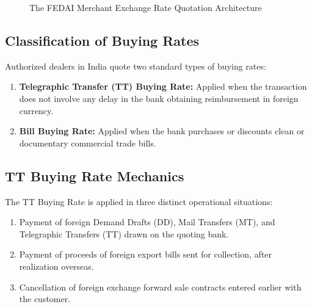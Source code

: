 \begin{figure}[htbp]
{%
    }
    \caption{The FEDAI Merchant Exchange Rate Quotation Architecture}
    \label{fig:fedai_merchant_rates}
\end{figure}

\subsection{Classification of Buying Rates}
Authorized dealers in India quote two standard types of buying rates:
\begin{enumerate}[leftmargin=*]
    \item \textbf{Telegraphic Transfer (TT) Buying Rate:} Applied when the transaction does not involve any delay in the bank obtaining reimbursement in foreign currency.
    \item \textbf{Bill Buying Rate:} Applied when the bank purchases or discounts clean or documentary commercial trade bills.
\end{enumerate}

\subsection{TT Buying Rate Mechanics}
The TT Buying Rate is applied in three distinct operational situations:
\begin{enumerate}[leftmargin=*]
    \item Payment of foreign Demand Drafts (DD), Mail Transfers (MT), and Telegraphic Transfers (TT) drawn on the quoting bank.
    \item Payment of proceeds of foreign export bills sent for collection, after realization overseas.
    \item Cancellation of foreign exchange forward sale contracts entered earlier with the customer.
\end{enumerate}


